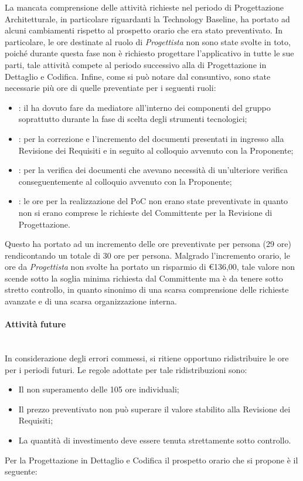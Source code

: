 La mancata comprensione delle attività richieste nel periodo di Progettazione Architetturale, in particolare riguardanti la Technology Baseline, ha portato ad alcuni cambiamenti rispetto al prospetto orario che era stato preventivato. In particolare, le ore destinate al ruolo di \textit{Progettista} non sono state svolte in toto, poiché durante questa fase non è richiesto progettare l'applicativo in tutte le sue parti, tale attività compete al periodo successivo alla di Progettazione in Dettaglio e Codifica. Infine, come si può notare dal consuntivo, sono state necessarie più ore di quelle preventiate per i seguenti ruoli:
\begin{itemize}
	\item \RdP{}: il \Res{} ha dovuto fare da mediatore all'interno dei componenti del gruppo soprattutto durante la fase di scelta degli strumenti tecnologici;
	\item \ana{}: per la correzione e l'incremento del documenti presentati in ingresso alla Revisione dei Requisiti e in seguito al colloquio avvenuto con la Proponente;
	\item \ver{}: per la verifica dei documenti che avevano necessità di un'ulteriore verifica conseguentemente al colloquio avvenuto con la Proponente;
	\item \progr{}: le ore per la realizzazione del PoC non erano state preventivate  in quanto non si erano comprese le richieste del Committente per la Revisione di Progettazione. 
\end{itemize} 
Questo ha portato ad un incremento delle ore preventivate per persona (29 ore) rendicontando un totale di 30 ore per persona.
Malgrado l'incremento orario, le ore da \textit{Progettista} non svolte ha portato un risparmio di \euro 136,00, tale valore non scende sotto la soglia minima richiesta dal Committente ma è da tenere sotto stretto controllo, in quanto sinonimo di una scarsa comprensione delle richieste avanzate e di una scarsa organizzazione interna.

\paragraph{Attività future}\mbox{}\\
In considerazione degli errori commessi, si ritiene opportuno ridistribuire le ore per i periodi futuri. Le regole adottate per tale ridistribuzioni sono:
\begin{itemize}
	\item Il non superamento delle 105 ore individuali;
	\item Il prezzo preventivato non può superare il valore stabilito alla Revisione dei Requisiti;
	\item La quantità di investimento deve essere tenuta strettamente sotto controllo.
\end{itemize}
\newpage
Per la Progettazione in Dettaglio e Codifica il prospetto orario che si propone è il seguente: 

